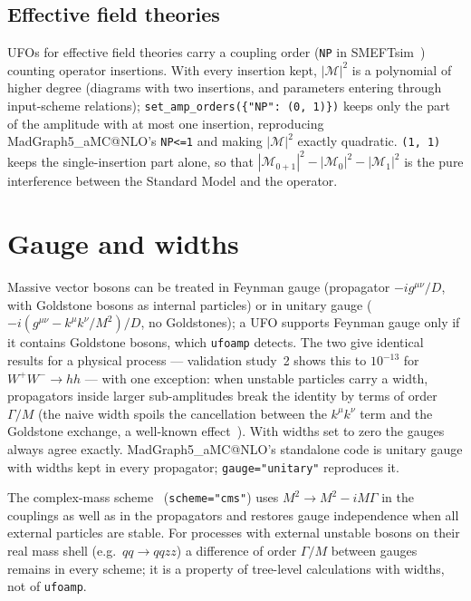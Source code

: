 \documentclass[11pt]{article}
\makeatletter
\newcommand{\ufoamp}{\texttt{ufoamp}}
\newcommand{\mg}{MadGraph5\_aMC@NLO}
\newcommand{\code}[1]{\texttt{#1}}
\newcommand{\M}{\mathcal{M}}
\makeatother
\begin{document}
\subsection{Effective field theories}\label{sec:eft}
UFOs for effective field theories carry a coupling order (\code{NP} in SMEFTsim~\cite{Brivio:2017btx,Brivio:2020onw}) counting operator insertions. With every insertion kept, $|\M|^2$ is a polynomial of higher degree (diagrams with two insertions, and parameters entering through input-scheme relations); \code{set\_amp\_orders(\{"NP": (0, 1)\})} keeps only the part of the amplitude with at most one insertion, reproducing \mg's \code{NP<=1} and making $|\M|^2$ exactly quadratic. \code{(1, 1)} keeps the single-insertion part alone, so that $|\M_{0+1}|^2-|\M_0|^2-|\M_1|^2$ is the pure interference between the Standard Model and the operator.

\section{Gauge and widths}\label{sec:gauge}
Massive vector bosons can be treated in Feynman gauge (propagator $-ig^{\mu\nu}/D$, with Goldstone bosons as internal particles) or in unitary gauge ($-i(g^{\mu\nu}-k^\mu k^\nu/M^2)/D$, no Goldstones); a UFO supports Feynman gauge only if it contains Goldstone bosons, which \ufoamp{} detects. The two give identical results for a physical process --- validation study~2 shows this to $10^{-13}$ for $W^+W^-\to hh$ --- with one exception: when unstable particles carry a width, propagators inside larger sub-amplitudes break the identity by terms of order $\Gamma/M$ (the naive width spoils the cancellation between the $k^\mu k^\nu$ term and the Goldstone exchange, a well-known effect~\cite{Baur:1995aa}). With widths set to zero the gauges always agree exactly. \mg's standalone code is unitary gauge with widths kept in every propagator; \code{gauge="unitary"} reproduces it.

The complex-mass scheme~\cite{Denner:1999gp,Denner:2005fg} (\code{scheme="cms"}) uses $M^2\to M^2-iM\Gamma$ in the couplings as well as in the propagators and restores gauge independence when all external particles are stable. For processes with external unstable bosons on their real mass shell (e.g.\ $q q\to q q z z$) a difference of order $\Gamma/M$ between gauges remains in every scheme; it is a property of tree-level calculations with widths, not of \ufoamp.
\end{document}
